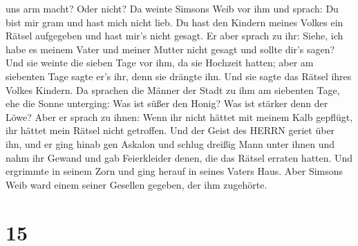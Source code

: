 uns arm macht? Oder nicht?  Da weinte Simsons Weib vor ihm
und sprach: Du bist mir gram und hast mich nicht lieb. Du hast den
Kindern meines Volkes ein Rätsel aufgegeben und hast mir's nicht gesagt.
Er aber sprach zu ihr: Siehe, ich habe es meinem Vater und meiner Mutter
nicht gesagt und sollte dir's sagen?  Und sie weinte die
sieben Tage vor ihm, da sie Hochzeit hatten; aber am siebenten Tage
sagte er's ihr, denn sie drängte ihn. Und sie sagte das Rätsel ihres
Volkes Kindern.  Da sprachen die Männer der Stadt zu ihm am
siebenten Tage, ehe die Sonne unterging: Was ist süßer den Honig? Was
ist stärker denn der Löwe? Aber er sprach zu ihnen: Wenn ihr nicht
hättet mit meinem Kalb gepflügt, ihr hättet mein Rätsel nicht getroffen.
 Und der Geist des HERRN geriet über ihn, und er ging hinab
gen Askalon und schlug dreißig Mann unter ihnen und nahm ihr Gewand und
gab Feierkleider denen, die das Rätsel erraten hatten. Und ergrimmte in
seinem Zorn und ging herauf in seines Vaters Haus.  Aber
Simsons Weib ward einem seiner Gesellen gegeben, der ihm zugehörte.

\hypertarget{section-14}{%
\section{15}\label{section-14}}

